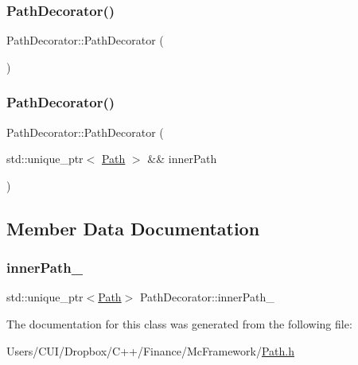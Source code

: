 \subsubsection{\texorpdfstring{Path\+Decorator()}{PathDecorator()}\hspace{0.1cm}{\footnotesize\ttfamily [1/2]}}
{\footnotesize\ttfamily Path\+Decorator\+::\+Path\+Decorator (\begin{DoxyParamCaption}{ }\end{DoxyParamCaption})\hspace{0.3cm}{\ttfamily [default]}}

\hypertarget{class_path_decorator_a26a8109e1d038f59140a243f1ceb6084}{}\label{class_path_decorator_a26a8109e1d038f59140a243f1ceb6084} 
\subsubsection{\texorpdfstring{Path\+Decorator()}{PathDecorator()}\hspace{0.1cm}{\footnotesize\ttfamily [2/2]}}
{\footnotesize\ttfamily Path\+Decorator\+::\+Path\+Decorator (\begin{DoxyParamCaption}\item[{std\+::unique\+\_\+ptr$<$ \hyperlink{class_path}{Path} $>$ \&\&}]{inner\+Path }\end{DoxyParamCaption})\hspace{0.3cm}{\ttfamily [inline]}}



\subsection{Member Data Documentation}
\hypertarget{class_path_decorator_a91f1257f216052a32b4ea78feb9d0755}{}\label{class_path_decorator_a91f1257f216052a32b4ea78feb9d0755} 
\subsubsection{\texorpdfstring{inner\+Path\+\_\+}{innerPath\_}}
{\footnotesize\ttfamily std\+::unique\+\_\+ptr$<$\hyperlink{class_path}{Path}$>$ Path\+Decorator\+::inner\+Path\+\_\+\hspace{0.3cm}{\ttfamily [protected]}}



The documentation for this class was generated from the following file\+:\begin{DoxyCompactItemize}
\item 
Users/\+C\+U\+I/\+Dropbox/\+C++/\+Finance/\+Mc\+Framework/\hyperlink{_path_8h}{Path.\+h}\end{DoxyCompactItemize}
